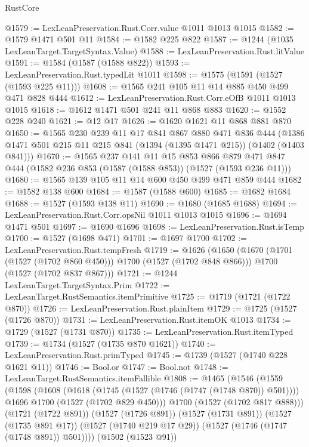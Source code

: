\begin{lexlean}{RustCore}
\begin{coremodule}
@1579 := LexLeanPreservation.Rust.Corr.value @1011 @1013 @1015
@1582 := @1579 @1471 @501 @11
@1584 := @1582 @225 @822
@1587 := @1244 (@1035 LexLeanTarget.TargetSyntax.Value)
@1588 := LexLeanPreservation.Rust.litValue
@1591 := @1584 (@1587 (@1588 @822))
@1593 := LexLeanPreservation.Rust.typedLit @1011
@1598 := @1575 (@1591 (@1527 (@1593 @225 @11)))
@1608 := @1565 @241 @105 @11 @14 @885 @450 @499 @471 @828 @444
@1612 := LexLeanPreservation.Rust.Corr.eOfB @1011 @1013 @1015
@1618 := @1612 @1471 @501 @241 @11 @868 @883
@1620 := @1552 @228 @240
@1621 := @12 @17
@1626 := @1620 @1621 @11 @868 @881 @870
@1650 := @1565
    @230
    @239
    @11
    @17
    @841
    @867
    @880
    @471
    @836
    @444
    (@1386 @1471 @501 @215 @11 @215 @841 (@1394 (@1395 @1471 @215)) (@1402 (@1403 @841)))
@1670 := @1565
    @237
    @141
    @11
    @15
    @853
    @866
    @879
    @471
    @847
    @444
    (@1582 @236 @853 (@1587 (@1588 @853)) (@1527 (@1593 @236 @11)))
@1680 := @1565 @139 @105 @11 @14 @600 @450 @499 @471 @859 @444
@1682 := @1582 @138 @600
@1684 := @1587 (@1588 @600)
@1685 := @1682 @1684
@1688 := @1527 (@1593 @138 @11)
@1690 := @1680 (@1685 @1688)
@1694 := LexLeanPreservation.Rust.Corr.opsNil @1011 @1013 @1015
@1696 := @1694 @1471 @501
@1697 := @1690 @1696
@1698 := LexLeanPreservation.Rust.isTemp
@1700 := @1527 (@1698 @471)
@1701 := @1697 @1700
@1702 := LexLeanPreservation.Rust.tempFresh
@1719 := @1626
    (@1650
      (@1670 (@1701 (@1527 (@1702 @860 @450))) @1700 (@1527 (@1702 @848 @866)))
      @1700
      (@1527 (@1702 @837 @867)))
@1721 := @1244 LexLeanTarget.TargetSyntax.Prim
@1722 := LexLeanTarget.RustSemantics.itemPrimitive
@1725 := @1719 (@1721 (@1722 @870))
@1726 := LexLeanPreservation.Rust.plainItem
@1729 := @1725 (@1527 (@1726 @870))
@1731 := LexLeanPreservation.Rust.itemOK @1013
@1734 := @1729 (@1527 (@1731 @870))
@1735 := LexLeanPreservation.Rust.itemTyped
@1739 := @1734 (@1527 (@1735 @870 @1621))
@1740 := LexLeanPreservation.Rust.primTyped
@1745 := @1739 (@1527 (@1740 @228 @1621 @11))
@1746 := Bool.or
@1747 := Bool.not
@1748 := LexLeanTarget.RustSemantics.itemFallible
@1808 := @1465
    (@1546
      (@1559
        (@1598
          (@1608
            (@1618 (@1745 (@1527 (@1746 (@1747 (@1748 @870)) @501))))
            @1696
            @1700
            (@1527 (@1702 @829 @450)))
          @1700
          (@1527 (@1702 @817 @888)))
        (@1721 (@1722 @891))
        (@1527 (@1726 @891))
        (@1527 (@1731 @891))
        (@1527 (@1735 @891 @17))
        (@1527 (@1740 @219 @17 @29))
        (@1527 (@1746 (@1747 (@1748 @891)) @501))))
    (@1502 (@1523 @91))

\end{coremodule}
\end{lexlean}
